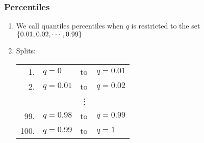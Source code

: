 \subsubsection{Percentiles \cite{statistics/book/Statistics-for-Data-Scientists/Maurits-Kaptein}} \label{Data/Describing Data/Central Tendency/Percentiles}

\begin{enumerate}
    \item We call quantiles percentiles when $q$ is restricted to the set $\left\{0.01, 0.02,\cdots, 0.99\right\}$

    \item Splits: \\
    \begin{tabular}{r l l l} %
        1. & $q = 0$ & to & $q = 0.01$ \\
        2. & $q = 0.01$ & to & $q = 0.02$ \\
        & & \vdots & \\
        99. & $q = 0.98$ & to & $q = 0.99$ \\
        100. & $q = 0.99$ & to & $q = 1$ \\
    \end{tabular}
\end{enumerate}



